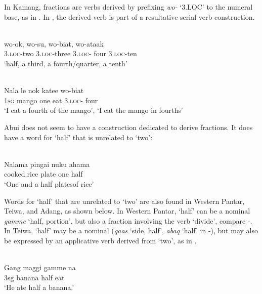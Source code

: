   

In Kamang, fractions are verbs derived by prefixing \textit{wo-} `3.LOC' to the numeral base, as in . In , the derived verb is part of a resultative serial verb construction.


\ea%
\label{bkm:Ref342746224}
\\
\gll wo-ok,    wo-su,  wo-biat,  wo-ataak     \\  
   3.\textsc{loc-}two    3.\textsc{loc-}three  3.\textsc{loc-} four  3.\textsc{loc-}ten   \\
\glt `half, a third, a fourth/quarter, a tenth' 
\z

   

 

 


\ea%
\label{bkm:Ref342746258}
\\
\gll  Nala  le  nok  katee  wo-biat  \\  
   \textsc{1sg } mango  one  eat  3.\textsc{loc-} four    \\
\glt `I eat a fourth of the mango', `I eat the mango in fourths'
\z

     

 

Abui does not seem to have a construction dedicated to derive fractions. It does have a word for `half' that is unrelated to `two':  


\ea
\label{ex:8:1249}
\\
 \gll   Nalama  pingai  nuku  ahama   \\
    cooked.rice  plate  one  half   \\
 \glt  `One and a half platesof rice'  
\z

 
Words for `half' that are unrelated to `two' are also found in Western Pantar,  Teiwa, and Adang, as shown below.  In Western Pantar, `half' can be a nominal \textit{gamme} `half, portion', but also a fraction involving the verb `divide', compare -. In Teiwa, `half' may be a nominal (\textit{qaas} `side, half', \textit{abaq} `half' in -), but may also be expressed by an applicative verb derived from `two', as in .


\ea%
\label{bkm:Ref342746707}
\\
\gll   Gang  maggi  gamme  na  \\  
      3sg  banana  half  eat  \\
\glt  `He ate half a banana.'
\z









